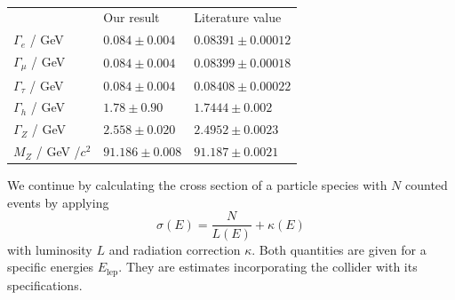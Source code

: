 \begin{table}[htpb]
    \centering
\caption{}
\label{tab:results}
    \begin{tabular}{l l l}
 \rowcolor{LightCyan} & Our result & Literature value \\
 \cellcolor{LightCyan}$\Gamma_e$ / GeV &   $ 0.084\pm0.004   $ & $0.08391 \pm 0.00012 $\\
 \cellcolor{LightCyan}$\Gamma_\mu$ / GeV&   $ 0.084\pm0.004 $ & $0.08399 \pm 0.00018 $\\
 \cellcolor{LightCyan}$\Gamma_\tau$ / GeV&   $ 0.084\pm0.004   $ & $0.08408 \pm 0.00022 $\\
 \cellcolor{LightCyan}$\Gamma_h$ / GeV&   $ 1.78\pm0.90     $ & $1.7444\pm0.002      $\\
 \cellcolor{LightCyan}$\Gamma_Z$ / GeV&   $ 2.558\pm0.020   $ & $2.4952\pm0.0023     $\\
 \cellcolor{LightCyan}$M_Z    $ / GeV /$c^2$&   $ 91.186\pm0.008  $ & $91.187\pm0.0021     $\\
    \end{tabular}
\end{table}




We continue by calculating the cross section of a particle species with $N$ counted events by applying  
\begin{equation}
    \sigma(E) = \frac{N}{L(E)} + \kappa(E)
\end{equation}
with luminosity $L$ and radiation correction $\kappa$. Both quantities are given for a specific energies $E_\mathrm{lep}$. 
They are estimates incorporating the collider with its specifications.
